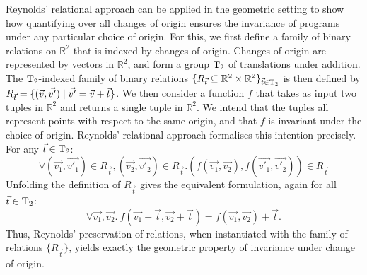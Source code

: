 Reynolds' relational approach can be applied in the geometric setting
to show how quantifying over all changes of origin ensures the
invariance of programs under any particular choice of origin. For
this, we first define a family of binary relations on $\mathbb{R}^2$
that is indexed by changes of origin. Changes of origin are
represented by vectors in $\mathbb{R}^2$, and form a group
$\mathrm{T}_2$ of translations under addition. The $\mathrm{T}_2$-indexed
family of binary relations $\{ R_{\vec{t}} \subseteq \mathbb{R}^2
\times \mathbb{R}^2 \}_{\vec{t} \in \mathrm{T}_2}$ is then defined by
$R_{\vec{t}} = \{ (\vec{v}, \vec{v'}) \mathrel| \vec{v'} = \vec{v} + \vec{t} \}$.
We then consider a function $f$ that takes as input two tuples in
$\mathbb{R}^2$ and returns a single tuple in $\mathbb{R}^2$. We intend
that the tuples all represent points with respect to the same origin,
and that $f$ is invariant under the choice of origin.  Reynolds'
relational approach formalises this intention precisely. For any
$\vec{t} \in \mathrm{T}_2$: %
\begin{equation}\label{eq:f-preserve-rel-frame}
  \forall (\vec{v_1},\vec{v'_1}) \in R_{\vec{t}},
  (\vec{v_2},\vec{v'_2}) \in R_{\vec{t}}. (f(\vec{v_1}, \vec{v_2}),
  f(\vec{v'_1}, \vec{v'_2})) \in R_{\vec{t}}
\end{equation}
Unfolding the definition of $R_{\vec{t}}$ gives the equivalent formulation,
again for all $\vec{t} \in \mathrm{T}_2$:
\begin{equation}\label{eq:f-invariant-frame}
  \forall \vec{v_1}, \vec{v_2}.\ f(\vec{v_1} + \vec{t},\vec{v_2} +
  \vec{t}) = f(\vec{v_1},\vec{v_2}) + \vec{t}.
\end{equation}
Thus, Reynolds' preservation of relations, when instantiated with the
family of relations $\{R_{\vec{t}}\}$, yields exactly the geometric
property of invariance under change of origin.

